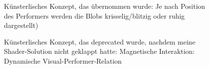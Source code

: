 \begin{figure}[htbp]
    \centering
    \caption{Künsterlisches Konzept, das übernommen wurde: Je nach Position des Performers werden die Blobs krisselig/blitzig oder ruhig dargestellt)}
    \label{fig:external_positioning}
\end{figure}

\begin{figure}[htbp]
    \centering
    \caption{Künsterlisches Konzept, das deprecated wurde, nachdem meine Shader-Solution nicht geklappt hatte: Magnetische Interaktion: Dynamische Visual-Performer-Relation}
    \label{fig:magnetic_interaction}
\end{figure}

